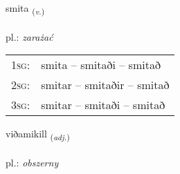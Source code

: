 \documentclass[frontgrid, backgrid]{flacards}\usepackage[]{graphicx}\usepackage[]{xcolor}
\begin{document}
\renewcommand{\flhead}{\vskip5pt \fboxsep=0pt {\small\bfseries\footnotesize Sagnorð | czasownik}}
\renewcommand{\fcfoot}{\vskip5pt \fboxsep=0pt \hspace{2pt}{\small\bfseries\footnotesize 3K}}

\renewcommand{\blhead}{\vskip5pt {\small\bfseries\footnotesize Sagnorð | czasownik }}
\renewcommand{\bcfoot}{\vskip5pt \hspace{2pt}{\small\bfseries\footnotesize 3K}}


{smita \small{\textsubscript{(\textit{v.})}} \\[1ex] %
\textphonetic{[smɪːta]} \\
pl.: \emph{zarażać} \\  [2ex]
\renewcommand*{\arraystretch}{0.8}
\begin{tabular}{p{1cm}l}
\textsc{1sg}: & smita -- smitaði -- smitað \\ 
\textsc{2sg}: & smitar -- smitaðir -- smitað \\ 
\textsc{3sg}: & smitar -- smitaði -- smitað \\ 
\end{tabular}
}

\renewcommand{\flhead}{\vskip5pt \fboxsep=0pt {\small\bfseries\footnotesize Lýsingarorð | przymiotnik}}
\renewcommand{\fcfoot}{\vskip5pt \fboxsep=0pt \hspace{2pt}{\small\bfseries\footnotesize 3K}}

\renewcommand{\blhead}{\vskip5pt {\small\bfseries\footnotesize Lýsingarorð | przymiotnik }}
\renewcommand{\bcfoot}{\vskip5pt \hspace{2pt}{\small\bfseries\footnotesize 3K}}


{viðamikill \small{\textsubscript{(\textit{adj.})}} \\[1ex] %
\textphonetic{[vɪːðamɪcɪtl̥]} \\
pl.: \emph{obszerny} \\  [2ex]
\renewcommand*{\arraystretch}{0.8}
}
\end{document}
